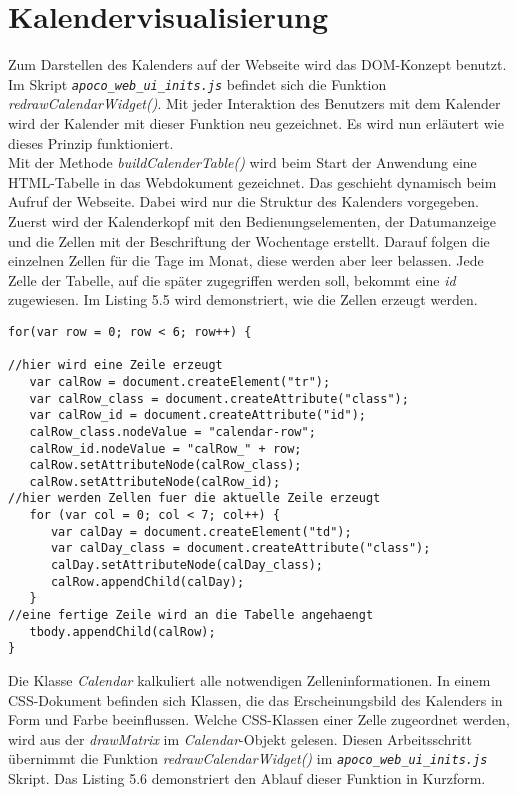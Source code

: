 

\section{Kalendervisualisierung}

Zum Darstellen des Kalenders auf der Webseite wird das DOM-Konzept benutzt.
Im Skript \emph{\texttt{apoco\_web\_ui\_inits.js}} befindet sich die Funktion \emph{redrawCalendarWidget()}.
Mit jeder Interaktion des Benutzers mit dem Kalender wird der Kalender mit dieser Funktion neu gezeichnet.
Es wird nun erl\"autert wie dieses Prinzip funktioniert.\\
Mit der Methode \emph{buildCalenderTable()} wird beim Start der Anwendung 
eine HTML-Tabelle in das Webdokument gezeichnet.
Das geschieht dynamisch beim Aufruf der Webseite.
Dabei wird nur die Struktur des Kalenders vorgegeben.
Zuerst wird der Kalenderkopf mit den Bedienungselementen, der Datumanzeige und die Zellen 
mit der Beschriftung der Wochentage erstellt.
Darauf folgen die einzelnen Zellen f\"ur die Tage im Monat, diese werden aber leer belassen. 
Jede Zelle der Tabelle, auf die sp\"ater zugegriffen werden soll, bekommt eine \emph{id} zugewiesen.
Im Listing 5.5 wird demonstriert, wie die Zellen erzeugt werden.

 \begin{lstlisting}[caption={Erzeugen von Zellen im Kalender per DOM}]
for(var row = 0; row < 6; row++) {

//hier wird eine Zeile erzeugt
   var calRow = document.createElement("tr");
   var calRow_class = document.createAttribute("class");
   var calRow_id = document.createAttribute("id");
   calRow_class.nodeValue = "calendar-row";
   calRow_id.nodeValue = "calRow_" + row;
   calRow.setAttributeNode(calRow_class);
   calRow.setAttributeNode(calRow_id);
//hier werden Zellen fuer die aktuelle Zeile erzeugt         
   for (var col = 0; col < 7; col++) {
      var calDay = document.createElement("td");
      var calDay_class = document.createAttribute("class");  
      calDay.setAttributeNode(calDay_class);
      calRow.appendChild(calDay);
   }
//eine fertige Zeile wird an die Tabelle angehaengt
   tbody.appendChild(calRow);  
}    
\end{lstlisting}

Die Klasse \emph{Calendar} kalkuliert alle notwendigen Zelleninformationen.
In einem CSS-Dokument befinden sich Klassen, 
die das Erscheinungsbild des Kalenders in Form und Farbe beeinflussen.
Welche CSS-Klassen einer Zelle zugeordnet werden, wird aus der \emph{drawMatrix} 
im \emph{Calendar}-Objekt gelesen.
Diesen Arbeitsschritt \"ubernimmt die Funktion \emph{redrawCalendarWidget()} 
im \emph{\texttt{apoco\_web\_ui\_inits.js}} Skript.
Das Listing 5.6 demonstriert den Ablauf dieser Funktion in Kurzform.

